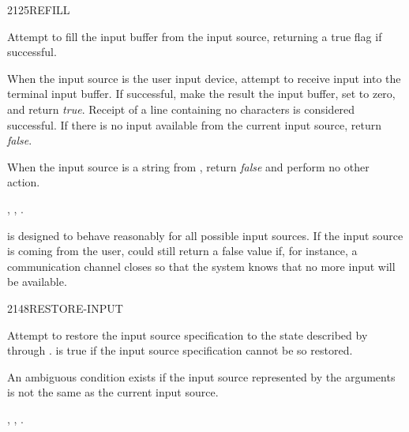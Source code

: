 %
%
%


\begin{worddef}{2125}{REFILL}
\item {}

	Attempt to fill the input buffer from the input source,
	returning a true flag if successful.

	When the input source is the user input device, attempt to
	receive input into the terminal input buffer. If successful,
	make the result the input buffer, set  to zero, and
	return \emph{true}. Receipt of a line containing no characters
	is considered successful. If there is no input available from
	the current input source, return \emph{false}.

	When the input source is a string from , return
	\emph{false} and perform no other action.

\see {},
	,
	.

	\begin{rationale} %
		 is designed to behave reasonably for all possible
		input sources. If the input source is coming from the user,
		 could still return a false value if, for instance,
		a communication channel closes so that the system knows that no
		more input will be available.
	\end{rationale}
\end{worddef}


\begin{worddef}{2148}{RESTORE-INPUT}
\item {}

	Attempt to restore the input source specification to the state
	described by  through .  is
	true if the input source specification cannot be so restored.

	An ambiguous condition exists if the input source represented
	by the arguments is not the same as the current input source.

\see {}, ,
	  .
\end{worddef}


